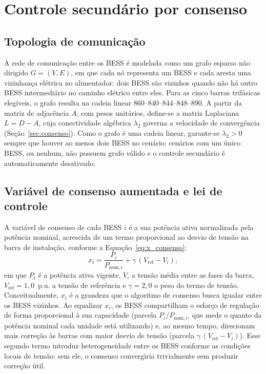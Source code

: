 \section{Controle secundário por consenso}
\label{sec:secundario}

\subsection{Topologia de comunicação}
\label{sec:topologia}

A rede de comunicação entre os BESS é modelada como um grafo esparso não dirigido $G = (V, E)$, em que cada nó representa um BESS e cada aresta uma vizinhança elétrica no alimentador: dois BESS são vizinhos quando não há outro BESS intermediário no caminho elétrico entre eles. Para as cinco barras trifásicas elegíveis, o grafo resulta na cadeia linear $860\text{--}840\text{--}844\text{--}848\text{--}890$. A partir da matriz de adjacência $A$, com pesos unitários, define-se a matriz Laplaciana $L = D - A$, cuja conectividade algébrica $\lambda_2$ governa a velocidade de convergência (Seção~\ref{sec:consenso}). Como o grafo é uma cadeia linear, garante-se $\lambda_2 > 0$ sempre que houver ao menos dois BESS no cenário; cenários com um único BESS, ou nenhum, não possuem grafo válido e o controle secundário é automaticamente desativado.

\subsection{Variável de consenso aumentada e lei de controle}
\label{sec:lei_controle}

A variável de consenso de cada BESS $i$ é a sua potência ativa normalizada pela potência nominal, acrescida de um termo proporcional ao desvio de tensão na barra de instalação, conforme a Equação~\eqref{eq:x_consenso}:
\begin{equation}
  x_i = \frac{P_i}{P_{\text{nom},i}} + \gamma\,(V_\text{ref} - V_i),
  \label{eq:x_consenso}
\end{equation}
em que $P_i$ é a potência ativa vigente, $V_i$ a tensão média 
entre as fases da barra, $V_\text{ref} = 1{,}0$~p.u. a tensão 
de referência e $\gamma = 2{,}0$ o peso do termo de tensão. 
Conceitualmente, $x_i$ é a grandeza que o algoritmo de consenso 
busca igualar entre os BESS vizinhos. Ao equalizar $x_i$, os 
BESS compartilham o esforço de regulação de forma proporcional 
à sua capacidade (parcela $P_i/P_{\text{nom},i}$, que mede o 
quanto da potência nominal cada unidade está utilizando) e, ao 
mesmo tempo, direcionam mais correção às barras com maior desvio 
de tensão (parcela $\gamma\,(V_\text{ref} - V_i)$). Esse 
segundo termo introduz heterogeneidade entre os BESS conforme 
as condições locais de tensão: sem ele, o consenso convergiria 
trivialmente sem produzir correção útil.

